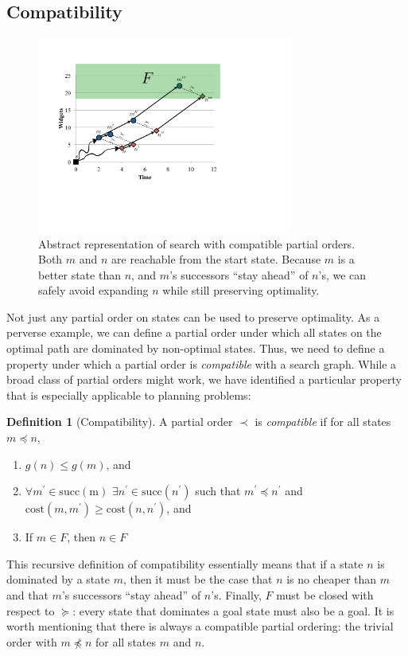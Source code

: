 \documentclass[letterpaper]{article}
\theoremstyle{plain} \newtheorem{theorem}{Theorem} \newtheorem{proposition}{Proposition} \newtheorem{lemma}{Lemma}
\theoremstyle{definition} \newtheorem{definition}{Definition} \newtheorem{conjecture}{Conjecture} \newtheorem*{example}{Example}
\theoremstyle{remark} \newtheorem*{remark}{Remark} \newtheorem*{note}{Note} \newtheorem{case}{Case}
\begin{document}
\subsection{Compatibility}
\begin{figure}
	\begin{center}
	\includegraphics[width=3.3in]{compatibility-2.pdf}
\end{center}
  \vspace{-.2in}
  \caption{Abstract representation of search with compatible partial
  orders. Both $m$ and $n$ are reachable from the start state.
  Because $m$ is a better state than $n$, and $m$'s successors
  ``stay ahead'' of $n$'s, we can safely avoid expanding $n$ while
  still preserving optimality.}
  \label{fig:compatibility}
\end{figure}

Not just any partial order on states can be used to preserve optimality. As a perverse
example, we can define a partial order under which all states on the optimal path
are dominated by non-optimal states. Thus, we need to define a property
under which a partial order is \textit{compatible} with a search graph. While
a broad class of partial orders might work, we have identified a particular 
property that is especially applicable to planning problems:

\begin{definition}[Compatibility]
	\label{def-compatibility}
  A partial order $\prec$ is \textit{compatible} if for all states $m \preceq n$,
  \begin{enumerate}
    \item $g(n) \le g(m)$, and 
    \item $\forall m^\prime \in \mathrm{succ(m)}$ $\exists n^\prime \in
      \mathrm{succ}(n^\prime)$ such that $m^\prime \preceq n^\prime$ and
      $\mathrm{cost}(m,m^\prime) \ge \mathrm{cost}(n, n^\prime)$, and
    \item If $m \in F$, then $n \in F$
  \end{enumerate}
\end{definition}
This recursive definition of compatibility essentially means that
if a state $n$ is dominated by a state $m$, then it must be the
case that $n$ is no cheaper than $m$ and that $m$'s successors
``stay ahead'' of $n$'s. Finally, $F$ must be closed with respect
to $\succeq$: every state that dominates a goal state must also be
a goal. It is worth mentioning that there is always a compatible
partial ordering: the trivial order with $m \npreceq n$ for all
states $m$ and $n$.
\end{document}
